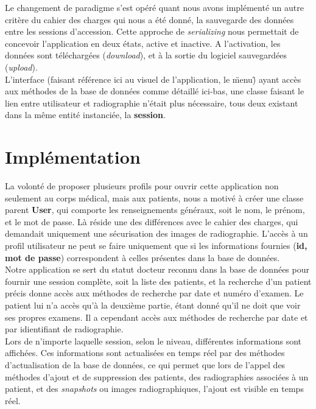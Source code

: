 \documentclass[12pt,a4paper]{article}
\begin{document}
\begin{multicols}{2}
Le changement de paradigme s'est opéré quant nous avons implémenté un autre critère du cahier des charges qui nous a été donné, la sauvegarde des données entre les sessions d'accession. Cette approche de \textit{serializing} nous permettait de concevoir l'application en deux états, active et inactive. A l'activation, les données sont téléchargées (\textit{download}), et à la sortie du logiciel sauvegardées (\textit{upload}). \\
		
L'interface (faisant référence ici au visuel de l'application, le \"menu\") ayant accès aux méthodes de la base de données comme détaillé ici-bas, une classe faisant le lien entre utilisateur et radiographie n'était plus nécessaire, tous deux existant dans la même entité instanciée, la \textbf{session}.
		
\section{Implémentation}
		
La volonté de proposer plusieurs profils pour ouvrir cette application non seulement au corps médical, mais aux patients, nous a motivé à créer une classe parent \textbf{User}, qui comporte les renseignements généraux, soit le nom, le prénom, et le mot de passe. Là réside une des différences avec le cahier des charges, qui demandait uniquement une sécurisation des images de radiographie. L'accès à un profil utilisateur ne peut se faire uniquement que si les informations fournies (\textbf{id, mot de passe}) correspondent à celles présentes dans la base de données. \\
		
Notre application se sert du statut docteur reconnu dans la base de données pour fournir une session complète, soit la liste des patients, et la recherche d'un patient précis donne accès aux méthodes de recherche par date et numéro d'examen. Le patient lui n'a accès qu'à la deuxième partie, étant donné qu'il ne doit que voir ses propres examens. Il a cependant accès aux méthodes de recherche par date et par idientifiant de radiographie.\\
		
Lors de n'importe laquelle session, selon le niveau, différentes informations sont affichées. Ces informations sont actualisées en temps réel par des méthodes d'actualisation de la base de données, ce qui permet que lors de l'appel des méthodes d'ajout et de suppression des patients, des radiographies associées à un patient, et des \textit{snapshots} ou images radiographiques, l'ajout est visible en temps réel.\\
		

\end{multicols}
\end{document}
